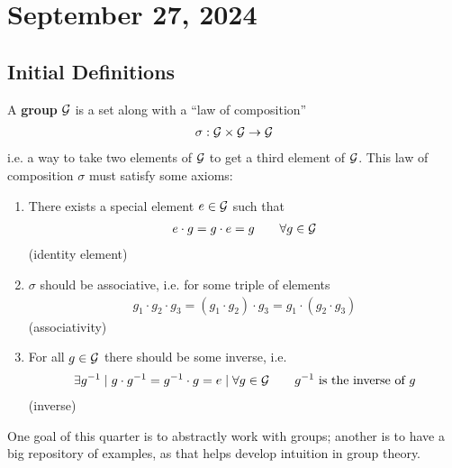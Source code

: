\section{September 27, 2024}

\subsection{Initial Definitions}
\begin{definition}
    A \textbf{group} $\mathcal{G}$ is a set along with a ``law of composition''
    \begin{align}
        \sigma: \mathcal{G} \times \mathcal{G} \to \mathcal{G}
    \end{align}
    i.e. a way to take two elements of $\mathcal{G}$ to get a third element of $\mathcal{G}$. This law of composition $\sigma$ must satisfy some axioms:
    \begin{enumerate}
        \item There exists a special element $e \in \mathcal{G}$ such that
        \begin{align}
            e \cdot g = g \cdot e = g \qsp \forall g \in \genericgroup
        \end{align}
        (identity element)
        \item $\sigma$ should be associative, i.e. for some triple of elements
        \begin{align}
            g_1 \cdot g_2 \cdot g_3 = (g_1 \cdot g_2) \cdot g_3 = g_1 \cdot (g_2 \cdot g_3)
        \end{align}
        (associativity)
        \item For all $g \in \mathcal{G}$ there should be some inverse, i.e.
        \begin{align}
            \exists g^{-1} \mid g \cdot g^{-1} = g^{-1} \cdot g = e \mid \forall g \in \genericgroup \qsp g^{-1} \text{ is the inverse of } g
        \end{align}
        (inverse)
    \end{enumerate}
\end{definition}
One goal of this quarter is to abstractly work with groups; another is to have a big repository of examples, as that helps develop intuition in group theory.

